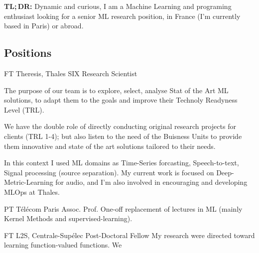 \documentclass[10pt]{article} %
\begin{document}
\vspace{-1.75cm}
\begin{center}
    \textbf{TL;\,DR:} Dynamic and curious, I am a Machine Learning and
    programing enthusiast looking for a senior ML research position, in France
    (I'm currently based in Paris) or abroad.
\end{center}
\vspace{-3.5mm}
\begin{paracol}{2}
%
%
\section{Positions}
%
%
%
%
%
{FT} %
{Theresis, Thales SIX} %
{Research Scientist} %
{The purpose of our team is to explore, select, analyse Stat of the Art
  ML solutions, to adapt them to the goals and improve their Technoly
  Readyness Level (TRL). \par
  We have the double role of directly conducting original research
  projects for clients (TRL 1-4); but also listen to the need of the
  Buisness Units to provide them innovative and state of the art
  solutions tailored to their needs.  \par
  In this context I used ML domains as Time-Series forcasting,
  Speech-to-text, Signal processing (source separation). My current work
  is focused on Deep-Metric-Learning for audio, and I'm also involved in
  encouraging and developing MLOps at Thales.}\par %
{PT} %
{T\'el\'ecom Paris} %
{Assoc. Prof.} %
{One-off replacement of lectures in ML (mainly Kernel Methods and
  supervised-learning).}\par
{} %
{FT} %
{L2S, Centrale-Sup\'elec} %
{Post-Doctoral Fellow} %
{My research were directed toward learning function-valued functions. We
}
\end{paracol}
\end{document}
